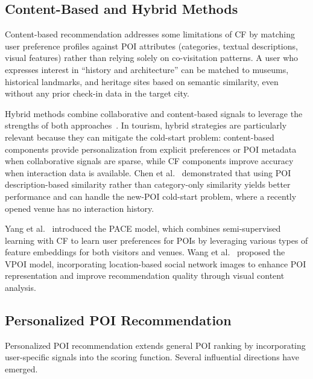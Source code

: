 \subsection{Content-Based and Hybrid Methods}
\label{sec:sota-pers-hybrid}

Content-based recommendation addresses some limitations of CF by matching user preference profiles against POI attributes (categories, textual descriptions, visual features) rather than relying solely on co-visitation patterns. A user who expresses interest in ``history and architecture'' can be matched to museums, historical landmarks, and heritage sites based on semantic similarity, even without any prior check-in data in the target city.

Hybrid methods combine collaborative and content-based signals to leverage the strengths of both approaches~\cite{burke2002hybrid}. In tourism, hybrid strategies are particularly relevant because they can mitigate the cold-start problem: content-based components provide personalization from explicit preferences or POI metadata when collaborative signals are sparse, while CF components improve accuracy when interaction data is available. Chen et al.~\cite{chen2019description} demonstrated that using POI description-based similarity rather than category-only similarity yields better performance and can handle the new-POI cold-start problem, where a recently opened venue has no interaction history.

Yang et al.~\cite{yang2012pace} introduced the PACE model, which combines semi-supervised learning with CF to learn user preferences for POIs by leveraging various types of feature embeddings for both visitors and venues. Wang et al.~\cite{wang2018vpoi} proposed the VPOI model, incorporating location-based social network images to enhance POI representation and improve recommendation quality through visual content analysis.

\subsection{Personalized POI Recommendation}
\label{sec:sota-pers-poi}

Personalized POI recommendation extends general POI ranking by incorporating user-specific signals into the scoring function. Several influential directions have emerged.

